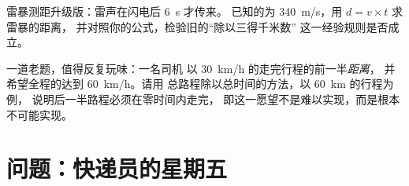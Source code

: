 \begin{exercise}[$\star\star$]\label{exo:g7:motion-average-speed:11}
雷暴测距升级版：雷声在闪电后 \qty{6}{s} 才传来。
已知的为 \qty{340}{m/s}，用 $d = v \times t$ 求雷暴的距离，
并对照你的公式，检验旧的“除以三得千米数”
这一经验规则是否成立。
\end{exercise}

\begin{exercise}[$\star\star\star$]\label{exo:g7:motion-average-speed:12}
一道老题，值得反复玩味：一名司机
以 \qty{30}{km/h} 的走完行程的前一半\emph{距离}，
并希望全程的达到 \qty{60}{km/h}。请用
总路程除以总时间的方法，以 \qty{60}{km} 的行程为例，
说明后一半路程必须在零时间内走完，
即这一愿望不是难以实现，而是根本不可能实现。
\end{exercise}

\section{问题：快递员的星期五}

